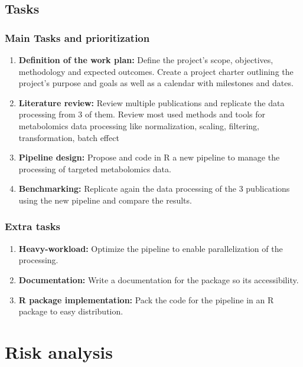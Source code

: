 \documentclass[ENG, BIB]{TFUOC}%
\begin{document}
\subsection{Tasks}
\subsubsection{Main Tasks and prioritization}
    \begin{enumerate}
        \item \textbf{Definition of the work plan:} Define the project's scope, objectives, methodology and expected outcomes. Create a project charter outlining the project's purpose and goals as well as a calendar with milestones and dates.
        \item \textbf{Literature review:} Review multiple publications and replicate the data processing from 3 of them. Review most used methods and tools for metabolomics data processing like normalization, scaling, filtering, transformation, batch effect
        \item \textbf{Pipeline design:} Propose and code in R a new pipeline to manage the processing of targeted metabolomics data.
        \item \textbf{Benchmarking:} Replicate again the data processing of the 3 publications using the new pipeline and compare the results.
    \end{enumerate}

    

\subsubsection{Extra tasks}
    \begin{enumerate}
        \item \textbf{Heavy-workload:} Optimize the pipeline to enable parallelization of the processing.
        \item \textbf{Documentation:} Write a documentation for the package so its accessibility.
        \item \textbf{R package implementation:} Pack the code for the pipeline in an R package to easy distribution.

    \end{enumerate}


\section{Risk analysis}
\end{document}
